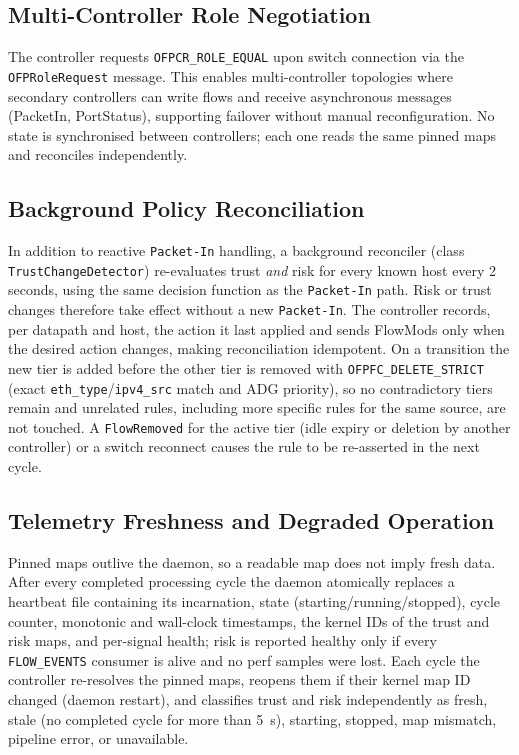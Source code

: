 \documentclass[conference]{IEEEtran}
\begin{document}
\subsection{Multi-Controller Role Negotiation}
The controller requests \texttt{OFPCR\_ROLE\_EQUAL} upon switch connection via the \texttt{OFPRoleRequest} message. This enables multi-controller topologies where secondary controllers can write flows and receive asynchronous messages (PacketIn, PortStatus), supporting failover without manual reconfiguration. No state is synchronised between controllers; each one reads the same pinned maps and reconciles independently.

\subsection{Background Policy Reconciliation}
In addition to reactive \texttt{Packet-In} handling, a background reconciler (class \texttt{TrustChangeDetector}) re-evaluates trust \emph{and} risk for every known host every 2 seconds, using the same decision function as the \texttt{Packet-In} path. Risk or trust changes therefore take effect without a new \texttt{Packet-In}. The controller records, per datapath and host, the action it last applied and sends FlowMods only when the desired action changes, making reconciliation idempotent. On a transition the new tier is added before the other tier is removed with \texttt{OFPFC\_DELETE\_STRICT} (exact \texttt{eth\_type}/\texttt{ipv4\_src} match and ADG priority), so no contradictory tiers remain and unrelated rules, including more specific rules for the same source, are not touched. A \texttt{FlowRemoved} for the active tier (idle expiry or deletion by another controller) or a switch reconnect causes the rule to be re-asserted in the next cycle.

\subsection{Telemetry Freshness and Degraded Operation}
\label{sec:freshness}
Pinned maps outlive the daemon, so a readable map does not imply fresh data. After every completed processing cycle the daemon atomically replaces a heartbeat file containing its incarnation, state (starting/running/stopped), cycle counter, monotonic and wall-clock timestamps, the kernel IDs of the trust and risk maps, and per-signal health; risk is reported healthy only if every \texttt{FLOW\_EVENTS} consumer is alive and no perf samples were lost. Each cycle the controller re-resolves the pinned maps, reopens them if their kernel map ID changed (daemon restart), and classifies trust and risk independently as fresh, stale (no completed cycle for more than 5~s), starting, stopped, map mismatch, pipeline error, or unavailable.
\end{document}
